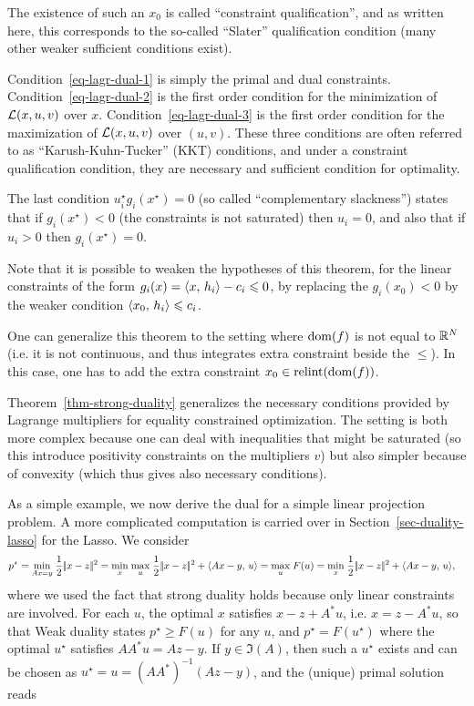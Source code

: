 The existence of such an $x_0$ is called ``constraint qualification'', and as written here, this corresponds to the so-called ``Slater'' qualification condition (many other weaker sufficient conditions exist). 

Condition~\eqref{eq-lagr-dual-1} is simply the primal and dual constraints. 
%
Condition~\eqref{eq-lagr-dual-2} is the first order condition for the minimization of $\mathcal{L}(x,u,v)$ over $x$.
%
Condition~\eqref{eq-lagr-dual-3} is the first order condition for the maximization of $\mathcal{L}(x,u,v)$ over $(u,v)$.
%
These three conditions are often referred to as ``Karush-Kuhn-Tucker'' (KKT) conditions, and under a constraint qualification condition, they are necessary and sufficient condition for optimality. 


The last condition $u_i^\star g_i(x^\star) = 0$ (so called ``complementary slackness'') states that if $g_i(x^\star)<0$ (the constraints is not saturated) then $u_i=0$, and also that if $u_i>0$ then $g_i(x^\star)=0$.

Note that it is possible to weaken the hypotheses of this theorem, for the linear constraints of the form $g_i(x) = \langle x,\,h_i\rangle - c_i \leqslant 0$, by replacing the $g_i(x_0)<0$ by the weaker condition $\langle x_0,\,h_i\rangle \leqslant c_i$.

One can generalize this theorem to the setting where $\operatorname{dom}(f)$ is not equal to $\mathbb{R}^N$ (i.e. it is not continuous, and thus integrates extra constraint beside the $\leq$). In this case, one has to add the extra constraint $x_0 \in \operatorname{relint}(\operatorname{dom}(f))$.
	
Theorem~\ref{thm-strong-duality} generalizes the necessary conditions provided by Lagrange multipliers for equality constrained optimization. The setting is both more complex because one can deal with inequalities that might be saturated (so this introduce positivity constraints on the multipliers $v$) but also simpler because of convexity (which thus gives also necessary conditions).

As a simple example, we now derive the dual for a simple linear projection problem. A more complicated computation is carried over in Section~\ref{sec-duality-lasso} for the Lasso. We consider
\begin{align*}
	p^\star = \underset{Ax=y}{\min}\; \frac{1}{2}|\!| x-z |\!|^2 &= \underset{x}{\min}\; \underset{u}{\max}\; \frac{1}{2}|\!| x-z |\!|^2 + \langle Ax-y,\,u\rangle
	= \underset{u}{\max}\; F(u) = \underset{x}{\min}\; \frac{1}{2}|\!| x-z |\!|^2 + \langle Ax-y,\,u\rangle, 
\end{align*}
where we used the fact that strong duality holds because only linear constraints are involved.
%
For each $u$, the optimal $x$ satisfies $x-z+A^*u$, i.e. $x=z-A^*u$, so that 
Weak duality states $p^\star \geq F(u)$ for any $u$, and $p^\star = F(u^\star)$ where the optimal $u^\star$ satisfies $AA^*u = Az-y$. If $y \in \Im(A)$, then such a $u^\star$ exists and can be chosen as $u^\star = u=(AA^*)^{-1} (Az -y)$, and the (unique) primal solution reads 

